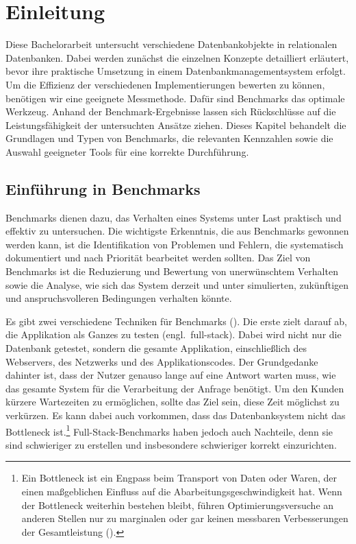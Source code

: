 \chapter{Einleitung}\label{ch:einleitung}

Diese Bachelorarbeit untersucht verschiedene Datenbankobjekte in relationalen Datenbanken.
Dabei werden zunächst die einzelnen Konzepte detailliert erläutert, bevor ihre praktische Umsetzung in einem Datenbankmanagementsystem erfolgt.
Um die Effizienz der verschiedenen Implementierungen bewerten zu können, benötigen wir eine geeignete Messmethode.
Dafür sind Benchmarks das optimale Werkzeug.
Anhand der Benchmark-Ergebnisse lassen sich Rückschlüsse auf die Leistungsfähigkeit der untersuchten Ansätze ziehen.
Dieses Kapitel behandelt die Grundlagen und Typen von Benchmarks, die relevanten Kennzahlen sowie die Auswahl geeigneter Tools für eine korrekte Durchführung.

\section{Einführung in Benchmarks}\label{sec:einleitung-einfuehrung}

Benchmarks dienen dazu, das Verhalten eines Systems unter Last praktisch und effektiv zu untersuchen.
Die wichtigste Erkenntnis, die aus Benchmarks gewonnen werden kann, ist die Identifikation von Problemen und Fehlern, die systematisch dokumentiert und nach Priorität bearbeitet werden sollten.
Das Ziel von Benchmarks ist die Reduzierung und Bewertung von unerwünschtem Verhalten sowie die Analyse, wie sich das System derzeit und unter simulierten, zukünftigen und anspruchsvolleren Bedingungen verhalten könnte.

Es gibt zwei verschiedene Techniken für Benchmarks (\cite[pp. 35--49]{schwartz2012high}).
Die erste zielt darauf ab, die Applikation als Ganzes zu testen (engl.\ full-stack).
Dabei wird nicht nur die Datenbank getestet, sondern die gesamte Applikation, einschließlich des Webservers, des Netzwerks und des Applikationscodes.
Der Grundgedanke dahinter ist, dass der Nutzer genauso lange auf eine Antwort warten muss, wie das gesamte System für die Verarbeitung der Anfrage benötigt.
Um den Kunden kürzere Wartezeiten zu ermöglichen, sollte das Ziel sein, diese Zeit möglichst zu verkürzen.
Es kann dabei auch vorkommen, dass das Datenbanksystem nicht das Bottleneck ist.\footnote{Ein Bottleneck ist ein Engpass beim Transport von Daten oder Waren, der einen maßgeblichen Einfluss auf die Abarbeitungsgeschwindigkeit hat. Wenn der Bottleneck weiterhin bestehen bleibt, führen Optimierungsversuche an anderen Stellen nur zu marginalen oder gar keinen messbaren Verbesserungen der Gesamtleistung (\cite{bottleneck}).}
Full-Stack-Benchmarks haben jedoch auch Nachteile, denn sie sind schwieriger zu erstellen und insbesondere schwieriger korrekt einzurichten.

